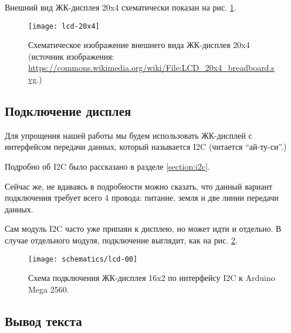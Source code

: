 \documentclass[../sparc.tex]{subfiles}
\begin{document}
Внешний вид ЖК-дисплея 20x4 схематически показан на рис. \ref{fig:lcd-20x4}.

\begin{figure}[h]
  \centering
  \texttt{[image: lcd-20x4]}
  \caption{Схематическое изображение внешнего вида ЖК-дисплея 20x4 (источник
    изображения:
    \url{https://commons.wikimedia.org/wiki/File:LCD_20x4_breadboard.svg}.)}
  \label{fig:lcd-20x4}
\end{figure}

\subsection{Подключение дисплея}

Для упрощения нашей работы мы будем использовать ЖК-дисплей с интерфейсом
передачи данных, который называется \gls{I2C} (читается ``ай-ту-си''.)

Подробно об I2C было рассказано в разделе \ref{section:i2c}.

Сейчас же, не вдаваясь в подробности можно сказать, что данный вариант
подключения требует всего 4 провода: питание, земля и две линии передачи данных.

Сам модуль I2C часто уже припаян к дисплею, но может идти и отдельно.  В случае
отдельного модуля, подключение выглядит, как на рис. \ref{fig:lcd-00}.

\begin{figure}[H]
  \centering
  \texttt{[image: schematics/lcd-00]}
  \caption{Схема подключения ЖК-дисплея 16x2 по интерфейсу I2C к Arduino Mega
    2560.}
  \label{fig:lcd-00}
\end{figure}


\subsection{Вывод текста}
\end{document}
